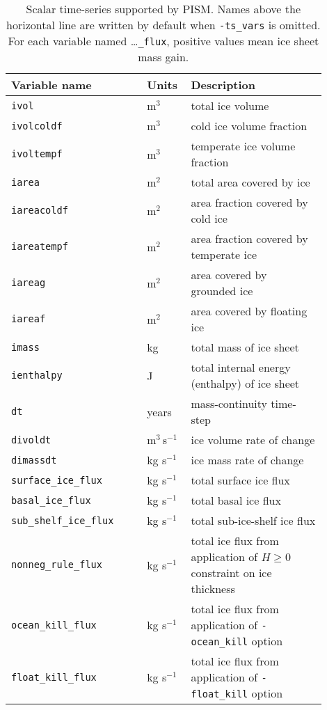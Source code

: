 \begin{table}[ht]
  \caption{Scalar time-series supported by PISM.  Names above the horizontal line are written by default when \texttt{-ts_vars} is omitted.  For each variable named \dots\texttt{_flux}, positive values mean ice sheet mass gain.}
  \centering
  \begin{tabular}{p{0.4\linewidth}p{0.1\linewidth}p{0.4\linewidth}}\toprule
   \textbf{Variable name} & \textbf{Units} & \textbf{Description}\\
   \midrule
    \texttt{ivol} &m$^{3}$ & total ice volume\\
    \texttt{ivolcoldf} &m$^{3}$ & cold ice volume fraction\\
    \texttt{ivoltempf} &m$^{3}$ & temperate ice volume fraction\\
    \texttt{iarea} & m$^{2}$ & total area covered by ice \\
    \texttt{iareacoldf} & m$^{2}$ & area fraction covered by cold ice \\
    \texttt{iareatempf} & m$^{2}$ & area fraction covered by temperate ice \\
    \texttt{iareag} & m$^{2}$ & area covered by grounded ice\\
    \texttt{iareaf} & m$^{2}$ & area covered by floating ice\\
    \texttt{imass} & kg & total mass of ice sheet \\
    \texttt{ienthalpy} & J & total internal energy (enthalpy) of ice sheet \\
    \texttt{dt} & years & mass-continuity time-step\\ \hline

    \texttt{divoldt} & m$^{3}\,$s$^{-1}$ & ice volume rate of change\\
    \texttt{dimassdt} & kg s$^{-1}$ & ice mass rate of change\\
    \texttt{surface_ice_flux} & kg s$^{-1}$ & total surface ice flux \\
    \texttt{basal_ice_flux} & kg s$^{-1}$ & total basal ice flux \\
    \texttt{sub_shelf_ice_flux} & kg s$^{-1}$  & total sub-ice-shelf ice flux \\
    \texttt{nonneg_rule_flux} & kg s$^{-1}$  & total ice flux from application of $H\ge 0$ constraint on ice thickness \\
    \texttt{ocean_kill_flux} & kg s$^{-1}$  & total ice flux from application of \texttt{-ocean_kill} option  \\
    \texttt{float_kill_flux} & kg s$^{-1}$  & total ice flux from application of \texttt{-float_kill} option  \\
    \bottomrule
  \end{tabular}
 \label{tab:time-series}
\end{table}


